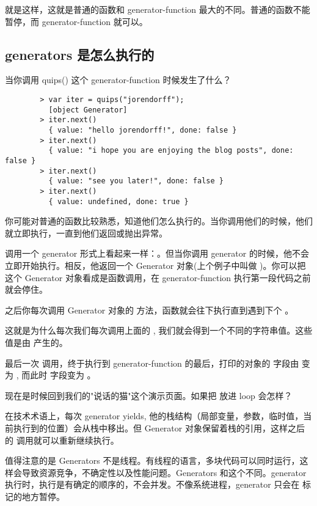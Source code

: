       就是这样，这就是普通的函数和 generator-function 最大的不同。普通的函数不能暂停，而 generator-function 就可以。

  \subsection{generators 是怎么执行的}
    \label{subsec:generators_是怎么执行的}

      当你调用 quips() 这个 generator-function 时候发生了什么？

      \begin{lstlisting}
        > var iter = quips("jorendorff");
          [object Generator]
        > iter.next()
          { value: "hello jorendorff!", done: false }
        > iter.next()
          { value: "i hope you are enjoying the blog posts", done: false }
        > iter.next()
          { value: "see you later!", done: false }
        > iter.next()
          { value: undefined, done: true }
      \end{lstlisting}

      你可能对普通的函数比较熟悉，知道他们怎么执行的。当你调用他们的时候，他们就立即执行，一直到他们返回或抛出异常。

      调用一个 generator 形式上看起来一样：。但当你调用 generator 的时候，他不会立即开始执行。相反，他返回一个 Generator 对象(上个例子中叫做 )。你可以把这个 Generator 对象看成是函数调用，在 generator-function 执行第一段代码之前就会停住。

      之后你每次调用 Generator 对象的  方法，函数就会往下执行直到遇到下个 。

      这就是为什么每次我们每次调用上面的 , 我们就会得到一个不同的字符串值。这些值是由  产生的。

      最后一次  调用，终于执行到 generator-function 的最后，打印的对象的  字段由  变为 , 而此时  字段变为 。

      现在是时候回到我们的"说话的猫"这个演示页面。如果把  放进 loop 会怎样？

      在技术术语上，每次 generator yields, 他的栈结构（局部变量，参数，临时值，当前执行到的位置）会从栈中移出。但 Generator 对象保留着栈的引用，这样之后的  调用就可以重新继续执行。

      值得注意的是 Generators 不是线程。有线程的语言，多块代码可以同时运行，这样会导致资源竞争，不确定性以及性能问题。Generators 和这个不同。generator 执行时，执行是有确定的顺序的，不会并发。不像系统进程，generator 只会在 
      标记的地方暂停。

